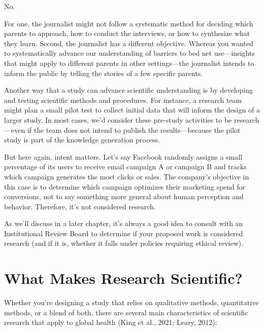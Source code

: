 \documentclass[
  letterpaper,
  DIV=11,
  numbers=noendperiod,
  oneside]{scrreprt}
\begin{document}
No.

For one, the journalist might not follow a systematic method for
deciding which parents to approach, how to conduct the interviews, or
how to synthesize what they learn. Second, the journalist has a
different objective. Whereas you wanted to systematically advance our
understanding of barriers to bed net use---insights that might apply to
different parents in other settings---the journalist intends to inform
the public by telling the stories of a few specific parents.

Another way that a study can advance scientific understanding is by
developing and testing scientific methods and procedures. For instance,
a research team might plan a small pilot test to collect initial data
that will inform the design of a larger study. In most cases, we'd
consider these pre-study activities to be research---even if the team
does not intend to publish the results---because the pilot study is part
of the knowledge generation process.

But here again, intent matters. Let's say Facebook randomly assigns a
small percentage of its users to receive email campaign A or campaign B
and tracks which campaign generates the most clicks or sales. The
company's objective in this case is to determine which campaign
optimizes their marketing spend for conversions, not to say something
more general about human perception and behavior. Therefore, it's not
considered research.

As we'll discuss in a later chapter, it's always a good idea to consult
with an Institutional Review Board to determine if your proposed work is
considered research (and if it is, whether it falls under policies
requiring ethical review).

\hypertarget{what-makes-research-scientific}{%
\section{What Makes Research
Scientific?}\label{what-makes-research-scientific}}

Whether you're designing a study that relies on qualitative methods,
quantitative methods, or a blend of both, there are several main
characteristics of scientific research that apply to global health (King
et al., 2021; Leary,
2012):
\end{document}
